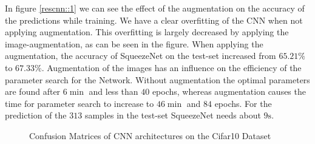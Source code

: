\documentclass[11pt]{article}
\begin{document}
In figure \ref{rescnn::1} we can see the effect of the augmentation on the accuracy of the predictions while training. We have a clear overfitting of the CNN when not applying augmentation. This overfitting is largely decreased by applying the image-augmentation, as can be seen in the figure. When applying the augmentation, the accuracy of SqueezeNet on the test-set increased from $65.21\%$ to $67.33\%$. Augmentation of the images has an influence on the efficiency of the parameter search for the Network. Without augmentation the optimal parameters are found after $6 \min$ and less than $40$ epochs, whereas augmentation causes the time for parameter search to increase to $46 \min$ and $84$ epochs. For the prediction of the $313$ samples in the test-set SqueezeNet needs about $9 \text{s}$.

\begin{figure}
\centering
{}
  \hfill
  \hfill
\caption{Confusion Matrices of CNN architectures on the Cifar10 Dataset}
\label{rescnn::4}
\end{figure}
\end{document}
